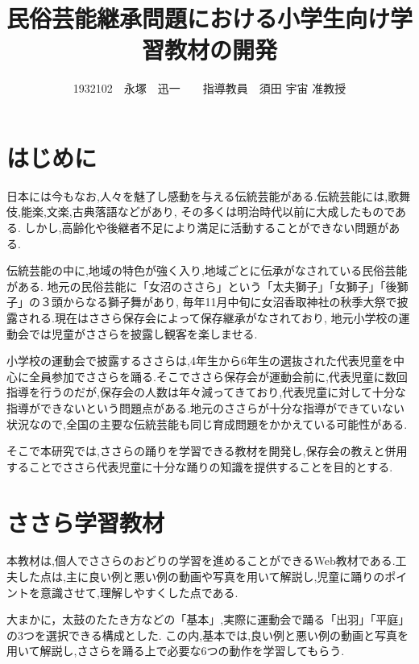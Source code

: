 \documentclass[twocolumn,10pt,a4j]{ltjsarticle}
\title{民俗芸能継承問題における小学生向け学習教材の開発}
\author{1932102　永塚　迅一　　指導教員　須田 宇宙 准教授}
\date{}
\begin{document}
\maketitle
\section{はじめに}

日本には今もなお,人々を魅了し感動を与える伝統芸能がある.伝統芸能には,歌舞伎,能楽,文楽,古典落語などがあり,
その多くは明治時代以前に大成したものである.
しかし,高齢化や後継者不足により満足に活動することができない問題がある.

伝統芸能の中に,地域の特色が強く入り,地域ごとに伝承がなされている民俗芸能がある.
地元の民俗芸能に「女沼のささら」という「太夫獅子」「女獅子」「後獅子」の３頭からなる獅子舞があり,
毎年11月中旬に女沼香取神社の秋季大祭で披露される\cite{suda2018}.現在はささら保存会によって保存継承がなされており,
地元小学校の運動会では児童がささらを披露し観客を楽しませる.

小学校の運動会で披露するささらは,4年生から6年生の選抜された代表児童を中心に全員参加でささらを踊る.そこでささら保存会が運動会前に,代表児童に数回指導を行うのだが,保存会の人数は年々減ってきており,代表児童に対して十分な指導ができないという問題点がある.地元のささらが十分な指導ができていない状況なので,全国の主要な伝統芸能も同じ育成問題をかかえている可能性がある.

そこで本研究では,ささらの踊りを学習できる教材を開発し,保存会の教えと併用することでささら代表児童に十分な踊りの知識を提供することを目的とする.

\section{ささら学習教材}
本教材は,個人でささらのおどりの学習を進めることができるWeb教材である.工夫した点は,主に良い例と悪い例の動画や写真を用いて解説し,児童に踊りのポイントを意識させて,理解しやすくした点である.

大まかに，太鼓のたたき方などの「基本」,実際に運動会で踊る「出羽」「平庭」の3つを選択できる構成とした.
この内,基本では,良い例と悪い例の動画と写真を用いて解説し,ささらを踊る上で必要な6つの動作を学習してもらう.
\end{document}
